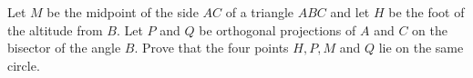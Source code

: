 Let $M$ be the midpoint of the side $AC$ of a triangle $ABC$ and let $H$ be the foot of the altitude from $B$. Let $P$ and $Q$ be orthogonal projections of $A$ and $C$ on the bisector of the angle $B$. Prove that the four points $H,P,M$ and $Q$ lie on the same circle.
